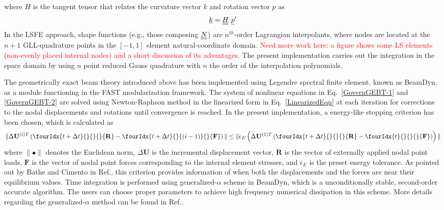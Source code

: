 where $H$ is the tangent tensor that relates the curvature vector $k$ and rotation vector $p$ as
\begin{equation}
    \label{Tensor}
    \underline{k} = \underline{\underline{H}}~ \underline{p}^\prime
\end{equation}
In the LSFE approach, shape functions (e.g., those composing $\underline{\underline{N}}$) are
$n^{th}$-order Lagrangian interpolants, where nodes are located at the $n+1$
GLL-quadrature points in the $[-1,1]$ element natural-coordinate domain.
\textcolor{red}{Need more work here: a figure shows some LS elements (non-evenly placed internal nodes) and a short discussion of its advantages.}
The present implementation  carries out the integration in the space domain by using $n$ point reduced Gauss quadrature with $n$ the order of the interpolation polynomials. 

The geometrically exact beam theory introduced above has been implemented using Legendre spectral finite element, known as BeamDyn, as a module functioning in the FAST modularization framework. The system of nonlinear equations in Eq.~\eqref{GovernGEBT-1} and \eqref{GovernGEBT-2} are solved using Newton-Raphson method in the linearized form in Eq.~\eqref{LinearizedEqn} at each iteration for corrections to the nodal displacements and rotations until convergence is reached. In the present implementation, a energy-like stopping criterion has been chosen, which is calculated as
\begin{equation}
    \label{StoppingCriterion}
    \| \Delta \mathbf{U}^{(i)T} \left( \fourIdx{t+\Delta t}{}{}{}{\mathbf{R}} -  \fourIdx{t+\Delta t}{}{(i-1)}{}{\mathbf{F}}  \right) \| \leq \| \epsilon_E \left( \Delta \mathbf{U}^{(1)T} \left( \fourIdx{t+\Delta t}{}{}{}{\mathbf{R}} - \fourIdx{t}{}{}{}{\mathbf{F}} \right) \right) \|
\end{equation}
where $\|\bullet\|$ denotes the Euclidean norm, $\Delta \mathbf{U}$ is the incremental displacement vector, $\mathbf{R}$ is the vector of externally applied nodal point loads, $\mathbf{F}$ is the vector of nodal point forces corresponding to the internal element stresses, and $\epsilon_E$ is the preset energy tolerance. As pointed out by Bathe and Cimento in Ref.\cite{Bathe-Cimento:1980}, this criterion provides information of when both the displacements and the forces are near their equilibrium values. Time integration is performed using generalized-$\alpha$ scheme in BeamDyn, which is a unconditionally stable, second-order accurate algorithm. The users can choose proper parameters to achieve high frequency numerical dissipation in this scheme. More details regarding the generalized-$\alpha$ method can be found in Ref.\cite{Chung-Hulbert:1993,Bauchau:2010}. 


